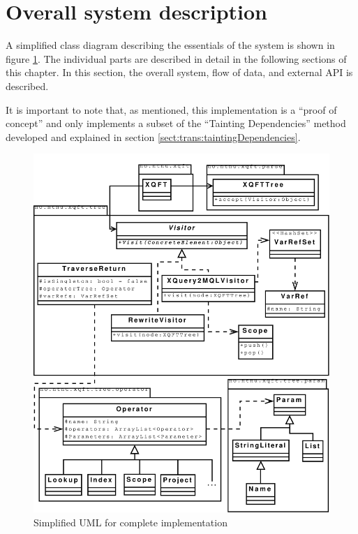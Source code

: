 \section{Overall system description}
A simplified class diagram describing the essentials of the system is shown in
figure \ref{fig:impl:sys:uml_complete}. The individual parts are described in
detail in the following sections of this chapter. In this section, the overall
system, flow of data, and external API is described.

It is important to note that, as mentioned, this implementation is a ``proof of
concept'' and only implements a subset of the ``Tainting Dependencies''
method developed and explained in section \ref{sect:trans:taintingDependencies}. 

\newpage

\begin{figure}[!htp]
\begin{center}
\includegraphics[scale=0.45]{diagrams/complete_uml}
  \caption{Simplified UML for complete implementation}
  \label{fig:impl:sys:uml_complete}
\end{center}
\end{figure}

